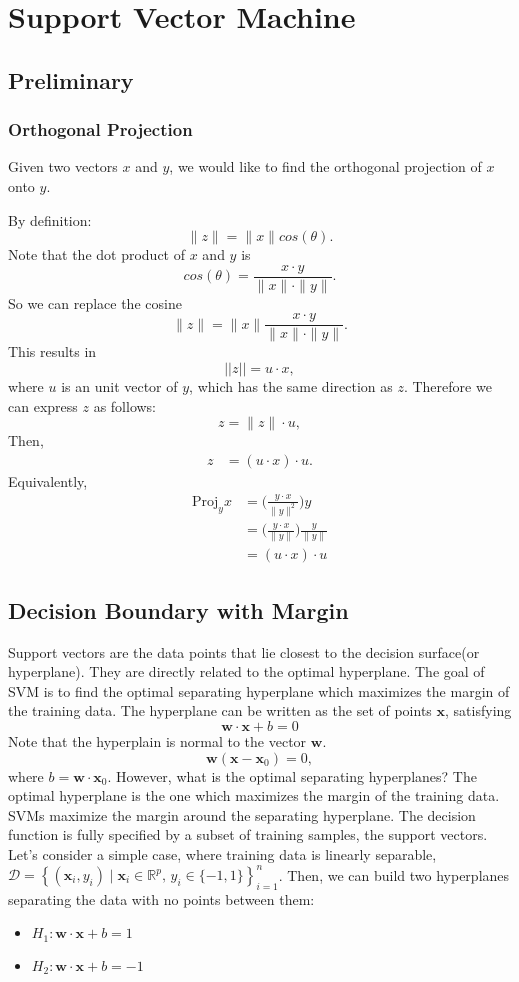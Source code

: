 \chapter{Support Vector Machine}
\section{Preliminary}

\subsection{Orthogonal Projection}
Given two vectors $x$ and $y$, we would like to find the orthogonal projection of $x$ onto $y$.

By definition:
$$\|z\| = \|x\|cos(\theta).$$
Note that the dot product of $x$ and $y$ is 
$$cos(\theta)= \frac{x\cdot y}{\|x\|\cdot\|y\|}.$$
So we can replace the cosine 
$$\|z\| = \|x\|\frac{x\cdot y}{\|x\|\cdot\|y\|}.$$
This results in 
$$||z|| = u\cdot x,$$
where $u$ is an unit vector of $y$, which has the same direction as $z$. Therefore we can express $z$ as follows: 
$$z = \|z\|\cdot u,$$
Then, 
\begin{align*}
	z &= (u\cdot x)\cdot u.
\end{align*}
Equivalently, 
\begin{align*}
	\textrm{Proj}_yx &= \Bigg(\frac{y\cdot x}{\|y\|^2}\Bigg)y\\
					 &= \Bigg(\frac{y\cdot x}{\|y\|}\Bigg)\frac{y}{\|y\|}\\
					 &= (u\cdot x)\cdot u
\end{align*}

\section{Decision Boundary with Margin}

Support vectors are the data points that lie closest to the decision surface(or hyperplane). They are directly related to the optimal hyperplane. The goal of SVM is to find the optimal separating hyperplane which maximizes the margin of the training data. The hyperplane can be written as the set of points $\mathbf{x}$, satisfying 
$$\mathbf{w}\cdot \mathbf{x}+b=0$$
Note that the hyperplain is normal to the vector $\mathbf{w}$. 
$$\mathbf{w}(\mathbf{x}-\mathbf{x}_0)=0,$$
where $b = \mathbf{w}\cdot\mathbf{x}_0$. However, what is the optimal separating hyperplanes? The optimal hyperplane is the one which maximizes the margin of the training data. SVMs maximize the margin around the separating hyperplane. The decision function is fully specified by a subset of training samples, the support vectors. Let's consider a simple case, where training data is linearly separable, $\mathcal{D} = \left\{ (\mathbf{x}_i, y_i)\mid\mathbf{x}_i \in \mathbb{R}^p,\, y_i \in \{-1,1\}\right\}_{i=1}^n$. Then, we can build two hyperplanes separating the data with no points between them:
\begin{itemize}
	\item $H_1:\mathbf{w}\cdot \mathbf{x}+b=1$
	\item $H_2:\mathbf{w}\cdot \mathbf{x}+b=-1$
\end{itemize}


